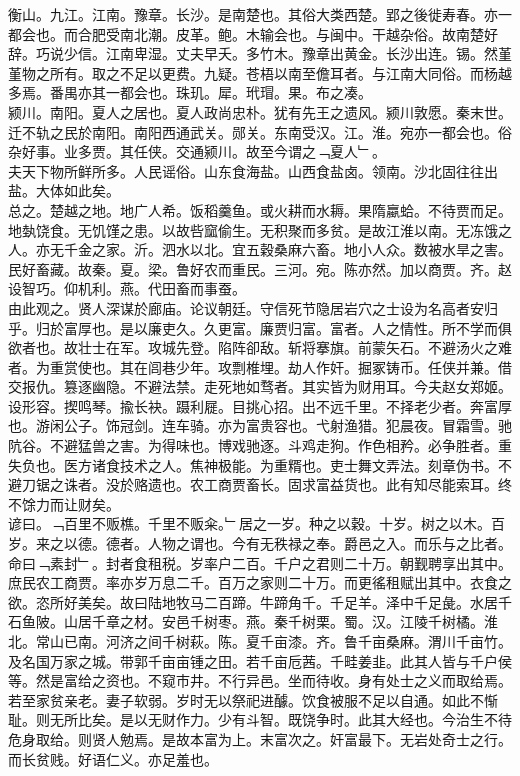 \documentclass{zhvt-classic}
\begin{document}
\hspace*{2em}衡山。九江。江南。豫章。长沙。是南楚也。其俗大类西楚。郢之後徙寿春。亦一都会也。而合肥受南北潮。皮革。鲍。木输会也。与闽中。干越杂俗。故南楚好辞。巧说少信。江南卑湿。丈夫早夭。多竹木。豫章出黄金。长沙出连。锡。然堇堇物之所有。取之不足以更费。九疑。苍梧以南至儋耳者。与江南大同俗。而杨越多焉。番禺亦其一都会也。珠玑。犀。玳瑁。果。布之凑。\\
\hspace*{2em}颍川。南阳。夏人之居也。夏人政尚忠朴。犹有先王之遗风。颍川敦愿。秦末世。迁不轨之民於南阳。南阳西通武关。郧关。东南受汉。江。淮。宛亦一都会也。俗杂好事。业多贾。其任侠。交通颍川。故至今谓之﹁夏人﹂。\\
\hspace*{2em}夫天下物所鲜所多。人民谣俗。山东食海盐。山西食盐卤。领南。沙北固往往出盐。大体如此矣。\\
\hspace*{2em}总之。楚越之地。地广人希。饭稻羹鱼。或火耕而水耨。果隋蠃蛤。不待贾而足。地埶饶食。无饥馑之患。以故呰窳偷生。无积聚而多贫。是故江淮以南。无冻饿之人。亦无千金之家。沂。泗水以北。宜五穀桑麻六畜。地小人众。数被水旱之害。民好畜藏。故秦。夏。梁。鲁好农而重民。三河。宛。陈亦然。加以商贾。齐。赵设智巧。仰机利。燕。代田畜而事蚕。\\
\hspace*{2em}由此观之。贤人深谋於廊庙。论议朝廷。守信死节隐居岩穴之士设为名高者安归乎。归於富厚也。是以廉吏久。久更富。廉贾归富。富者。人之情性。所不学而俱欲者也。故壮士在军。攻城先登。陷阵卻敌。斩将搴旗。前蒙矢石。不避汤火之难者。为重赏使也。其在闾巷少年。攻剽椎埋。劫人作奸。掘冢铸币。任侠并兼。借交报仇。篡逐幽隐。不避法禁。走死地如骛者。其实皆为财用耳。今夫赵女郑姬。设形容。揳鸣琴。揄长袂。蹑利屣。目挑心招。出不远千里。不择老少者。奔富厚也。游闲公子。饰冠剑。连车骑。亦为富贵容也。弋射渔猎。犯晨夜。冒霜雪。驰阬谷。不避猛兽之害。为得味也。博戏驰逐。斗鸡走狗。作色相矜。必争胜者。重失负也。医方诸食技术之人。焦神极能。为重糈也。吏士舞文弄法。刻章伪书。不避刀锯之诛者。没於赂遗也。农工商贾畜长。固求富益货也。此有知尽能索耳。终不馀力而让财矣。\\
\hspace*{2em}谚曰。﹁百里不贩樵。千里不贩籴。﹂居之一岁。种之以穀。十岁。树之以木。百岁。来之以德。德者。人物之谓也。今有无秩禄之奉。爵邑之入。而乐与之比者。命曰﹁素封﹂。封者食租税。岁率户二百。千户之君则二十万。朝觐聘享出其中。庶民农工商贾。率亦岁万息二千。百万之家则二十万。而更徭租赋出其中。衣食之欲。恣所好美矣。故曰陆地牧马二百蹄。牛蹄角千。千足羊。泽中千足彘。水居千石鱼陂。山居千章之材。安邑千树枣。燕。秦千树栗。蜀。汉。江陵千树橘。淮北。常山已南。河济之间千树萩。陈。夏千亩漆。齐。鲁千亩桑麻。渭川千亩竹。及名国万家之城。带郭千亩亩锺之田。若千亩卮茜。千畦姜韭。此其人皆与千户侯等。然是富给之资也。不窥市井。不行异邑。坐而待收。身有处士之义而取给焉。若至家贫亲老。妻子软弱。岁时无以祭祀进醵。饮食被服不足以自通。如此不惭耻。则无所比矣。是以无财作力。少有斗智。既饶争时。此其大经也。今治生不待危身取给。则贤人勉焉。是故本富为上。末富次之。奸富最下。无岩处奇士之行。而长贫贱。好语仁义。亦足羞也。\\
\end{document}
